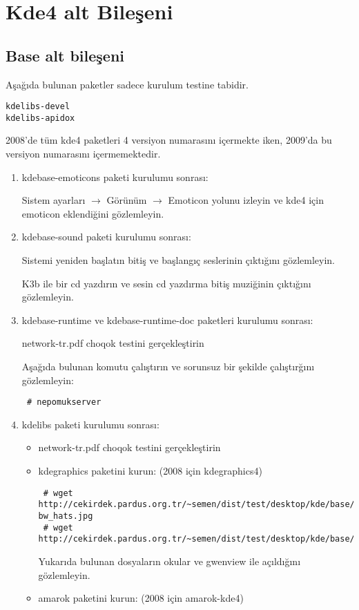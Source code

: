 \documentclass[a4paper,10pt]{article}
\begin{document}
\section{Kde4 alt Bileşeni}
\subsection*{Base alt bileşeni}

\item  Aşağıda bulunan paketler sadece kurulum testine tabidir.
\begin{verbatim}
kdelibs-devel
kdelibs-apidox 
\end{verbatim}

2008'de tüm kde4 paketleri 4 versiyon numarasını içermekte iken, 2009'da bu versiyon numarasını içermemektedir.
\begin{enumerate} 
\item kdebase-emoticons paketi kurulumu sonrası:

Sistem ayarları $\rightarrow$ Görünüm $\rightarrow$ Emoticon yolunu izleyin ve kde4 için emoticon eklendiğini gözlemleyin.
\item kdebase-sound paketi kurulumu sonrası:

Sistemi yeniden başlatın bitiş ve başlangıç seslerinin çıktığını gözlemleyin.

K3b ile bir cd yazdırın ve sesin cd yazdırma bitiş muziğinin çıktığını gözlemleyin.
\item kdebase-runtime ve kdebase-runtime-doc paketleri kurulumu sonrası:

network-tr.pdf choqok testini gerçekleştirin

Aşağıda bulunan komutu çalıştırın ve sorunsuz bir şekilde çalıştırğını gözlemleyin:
\begin{verbatim}
 # nepomukserver
\end{verbatim}

 \item kdelibs paketi kurulumu sonrası:
\begin{itemize}
 \item network-tr.pdf choqok testini gerçekleştirin


 \item kdegraphics paketini kurun: (2008 için kdegraphics4)
\begin{verbatim}
 # wget http://cekirdek.pardus.org.tr/~semen/dist/test/desktop/kde/base/circus-bw_hats.jpg
 # wget http://cekirdek.pardus.org.tr/~semen/dist/test/desktop/kde/base/tepecik_01.png
\end{verbatim}
Yukarıda bulunan dosyaların okular ve gwenview ile açıldığını gözlemleyin.
\item amarok paketini kurun: (2008 için amarok-kde4) 


\end{itemize}
\end{enumerate}
\end{document}
